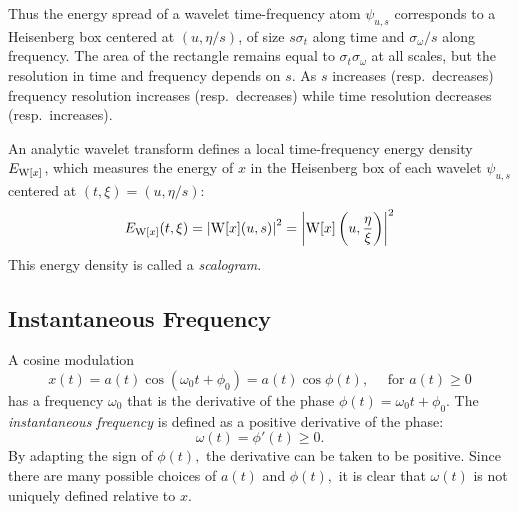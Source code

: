 Thus the energy spread of a wavelet time-frequency atom $\psi_{u,s}$
corresponds to a Heisenberg box centered at $(u, \eta/s)$, of size
$s\sigma_t$ along time and $\sigma_{\omega}/s$ along frequency.  The
area of the rectangle remains equal to $\sigma_t\sigma_{\omega}$ at
all scales, but the resolution in time and frequency depends on $s$.
As $s$ increases (resp.~decreases) frequency resolution increases
(resp.~decreases) while time resolution decreases (resp.~increases).

An analytic wavelet transform defines a local time-frequency energy
density $E_{\operatorname{W}[x]}$, which measures the energy of $x$ in the Heisenberg box
of each wavelet $\psi_{u,s}$ centered at $(t, \xi)=(u, \eta/s)$:
\begin{equation}\label{eqn:energyDensity}
E_{\operatorname{W}[x]}(t,\xi) = \left|\operatorname{W}[x](u,s)\right|^2 =
\left|\operatorname{W}[x]\left(u,\frac{\eta}{\xi}\right)\right|^2
\end{equation}
This energy density is called a \emph{scalogram}.

{\subsection{Instantaneous Frequency\protect\footnotemark}
}
\label{sec:instfreq}
A cosine modulation 
\[
x(t) = a(t) \cos(\omega_0 t + \phi_0) 
= a(t) \cos\phi(t), \quad \text{ for } a(t) \geq 0
\]
has a frequency $\omega_0$ that is the derivative of the phase
$\phi(t) = \omega_0 t + \phi_0$.  The {\it instantaneous frequency} is
defined as a positive derivative of the phase:
\begin{equation}
\label{eqn:instfreq}
\omega(t) = \phi'(t) \geq 0.
\end{equation}
By adapting the sign of $\phi(t),$ the derivative can be taken to be
positive.  Since there are many possible choices of $a(t)$ and
$\phi(t),$ it is clear that $\omega(t)$ is not uniquely defined
relative to $x$. 

